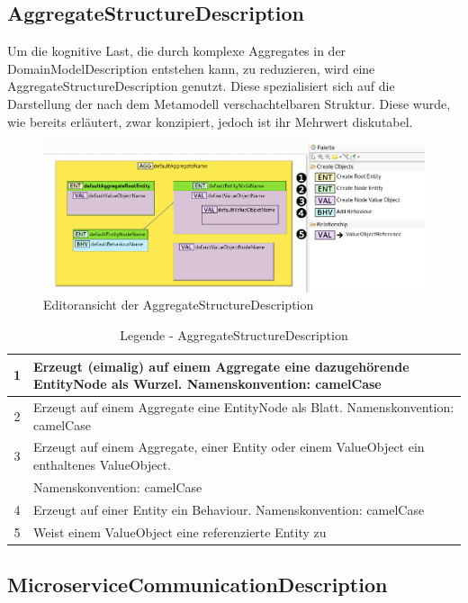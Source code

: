 \newpage
\subsection{AggregateStructureDescription}

Um die kognitive Last, die durch komplexe Aggregates in der DomainModelDescription entstehen kann, zu reduzieren, wird eine AggregateStructureDescription genutzt. Diese spezialisiert sich auf die Darstellung der nach dem Metamodell verschachtelbaren Struktur. Diese wurde, wie bereits erläutert, zwar konzipiert, jedoch ist ihr Mehrwert diskutabel.

\begin{figure}[ht]
\centering
\includegraphics[width=\textwidth]{bilder/k5/3.png}
\caption{Editoransicht der AggregateStructureDescription}
\end{figure}


\begin{table}[h]
\centering
\footnotesize
\begin{tabularx}{\textwidth}{|c|X|}
\hline
1 & Erzeugt (eimalig) auf einem Aggregate eine dazugehörende EntityNode als Wurzel. Namenskonvention: camelCase \\ \hline
2 & Erzeugt auf einem Aggregate eine EntityNode als Blatt. Namenskonvention: camelCase \\ \hline
3 & Erzeugt auf einem Aggregate, einer Entity oder einem ValueObject ein enthaltenes ValueObject.\\ & Namenskonvention: camelCase \\ \hline
4 & Erzeugt auf einer Entity ein Behaviour. Namenskonvention: camelCase \\ \hline
5 & Weist einem ValueObject eine referenzierte Entity zu \\ \hline
\end{tabularx}
\caption{Legende - AggregateStructureDescription}
\end{table}

\newpage
\subsection{MicroserviceCommunicationDescription}

